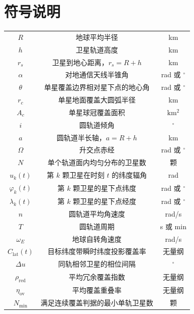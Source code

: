 \documentclass[withoutpreface,bwprint]{cumcmthesis} %
\begin{document}
\section{符号说明}
	\begin{table}[H] %
		\captionsetup{skip=4pt} %
		\centering
		\setlength{\arrayrulewidth}{1pt} %
		\begin{tabular}{ccc}
			\hline
			\makebox[0.15\textwidth][c]{符号} & \makebox[0.6\textwidth][c]{说明} & \makebox[0.15\textwidth][c]{单位} \\ 
			\hline
			$R$ & 地球平均半径 & km \\
			$h$ & 卫星轨道高度 & km \\
			$r_s$ & 卫星到地心距离，$r_s=R+h$ & km \\
			$\alpha$ & 对地通信天线半锥角 & rad 或 $^\circ$ \\
			$\theta$ & 单星覆盖边界相对星下点的地心角 & rad 或 $^\circ$ \\
			$r_c$ & 单星地面覆盖大圆弧半径 & km \\
			$A_c$ & 单星球冠覆盖面积 & $\mathrm{km^2}$ \\
			$i$ & 圆轨道倾角 & $^\circ$ \\
			$a$ & 圆轨道半长轴，$a=R+h$ & km \\
			$\Omega$ & 升交点赤经 & rad 或 $^\circ$ \\
			$N$ & 单个轨道面内均匀分布的卫星数 & 颗 \\
			$u_k(t)$ & 第 $k$ 颗卫星在时刻 $t$ 的纬度辐角 & rad \\
			$\varphi_k(t)$ & 第 $k$ 颗卫星的星下点纬度 & rad 或 $^\circ$ \\
			$\lambda_k(t)$ & 第 $k$ 颗卫星的星下点经度 & rad 或 $^\circ$ \\
			$n$ & 圆轨道平均角速度 & rad/s \\
			$T$ & 圆轨道周期 & s 或 min \\
			$\omega_E$ & 地球自转角速度 & rad/s \\
			$C_{\mathrm{lat}}(t)$ & 目标纬度带瞬时纬度投影覆盖率 & 无量纲 \\
			$\Delta u$ & 同轨相邻卫星的相位间隔 & $^\circ$ \\
			$\rho_{\mathrm{red}}$ & 平均冗余覆盖指数 & 无量纲 \\
			$\eta_{\mathrm{ov}}$ & 平均覆盖重叠率 & 无量纲 \\
			$N_{\min}$ & 满足连续覆盖判据的最小单轨卫星数 & 颗 \\
			\hline
		\end{tabular}
	\end{table}
\end{document}
